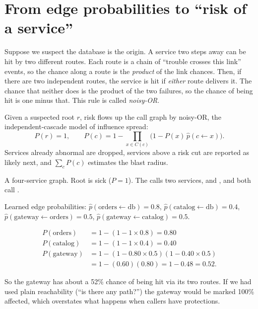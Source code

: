 \section{From edge probabilities to ``risk of a service''}
\begin{simplebox}
Suppose we suspect the database is the origin. A service two steps away can be hit by two different routes. Each route is a chain of ``trouble crosses this link'' events, so the chance along a route is the \emph{product} of the link chances. Then, if there are two independent routes, the service is hit if \emph{either} route delivers it. The chance that neither does is the product of the two failures, so the chance of being hit is one minus that. This rule is called \emph{noisy-OR}.
\end{simplebox}

\begin{techbox}
Given a suspected root $r$, risk flows up the call graph by noisy-OR, the independent-cascade model of influence spread:
\[
P(r)=1,\qquad P(c)=1-\prod_{x\in C(c)}\bigl(1-P(x)\,\hat p(c\leftarrow x)\bigr).
\]
Services already abnormal are dropped, services above a risk cut are reported as likely next, and $\sum_c P(c)$ estimates the blast radius.
\end{techbox}

\begin{examplebox}
A four-service graph. Root  is sick ($P=1$). The  calls two services,  and , and both call .

Learned edge probabilities: $\hat p(\text{orders}\leftarrow\text{db})=0.8$, $\hat p(\text{catalog}\leftarrow\text{db})=0.4$, $\hat p(\text{gateway}\leftarrow\text{orders})=0.5$, $\hat p(\text{gateway}\leftarrow\text{catalog})=0.5$.

\begin{align*}
P(\text{orders})&=1-(1-1\times0.8)=0.80\\
P(\text{catalog})&=1-(1-1\times0.4)=0.40\\
P(\text{gateway})&=1-(1-0.80\times0.5)(1-0.40\times0.5)\\
&=1-(0.60)(0.80)=1-0.48=0.52.
\end{align*}

So the gateway has about a 52\% chance of being hit via its two routes. If we had used plain reachability (``is there any path?'') the gateway would be marked 100\% affected, which overstates what happens when callers have protections.
\end{examplebox}

